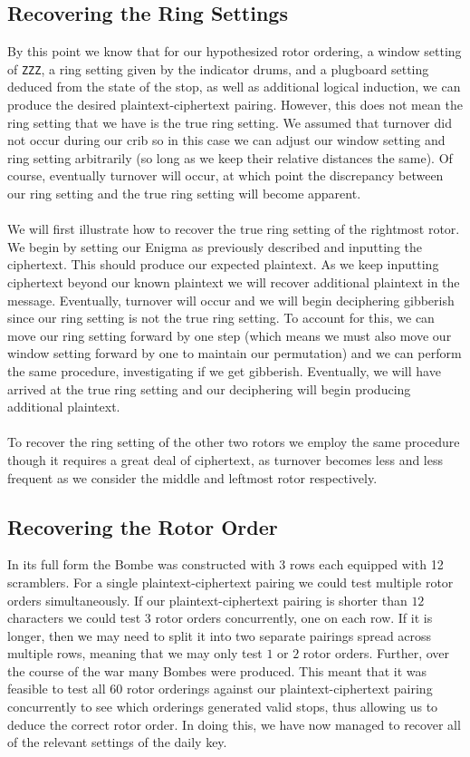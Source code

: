 \subsection{Recovering the Ring Settings}\label{bombe_ring_setting}
By this point we know that for our hypothesized rotor ordering, a
window setting of \texttt{ZZZ}, a ring setting given by the indicator
drums, and a plugboard setting deduced from the state of the stop, as
well as additional logical induction, we can produce the desired plaintext-ciphertext pairing. However, this does not mean the ring
setting that we have is the true ring setting. We assumed that
turnover did not occur during our crib so in this case we can adjust
our window setting and ring setting arbitrarily (so long as we keep
their relative distances the same). Of course, eventually turnover
will occur, at which point the discrepancy between our ring setting
and the true ring setting will become apparent.
\\\\We will first illustrate how to recover the true ring setting of
the rightmost rotor. We begin by setting our Enigma as previously
described and inputting the ciphertext. This should produce our
expected plaintext. As we keep inputting ciphertext beyond our known
plaintext we will recover additional plaintext in the message.
Eventually, turnover will occur and we will begin deciphering
gibberish since our ring setting is not the true ring setting. To
account for this, we can move our ring setting forward by one step
(which means we must also move our window setting forward by one to
maintain our permutation) and we can perform the same procedure,
investigating if we get gibberish. Eventually, we will have arrived
at the true ring setting and our deciphering will begin producing
additional plaintext.
\\\\To recover the ring setting of the other two rotors we employ the
same procedure though it requires a great deal of ciphertext, as
turnover becomes less and less frequent as we consider the middle and
leftmost rotor respectively.

\subsection{Recovering the Rotor Order}
In its full form the Bombe was constructed with $3$ rows each
equipped with 12 scramblers. For a single plaintext-ciphertext
pairing we could test multiple rotor orders simultaneously. If our
plaintext-ciphertext pairing is shorter than $12$ characters we could
test $3$ rotor orders concurrently, one on each row. If it is longer, then we may need
to split it into two separate pairings spread across multiple rows,
meaning that we may only test $1$ or $2$ rotor orders. Further, over
the course of the war many Bombes were produced. This meant that it
was feasible to test all $60$ rotor orderings against our
plaintext-ciphertext pairing concurrently to see which orderings generated valid
stops, thus allowing us to deduce the correct rotor order. In doing
this, we have now managed to recover all of the relevant settings of
the daily key.

